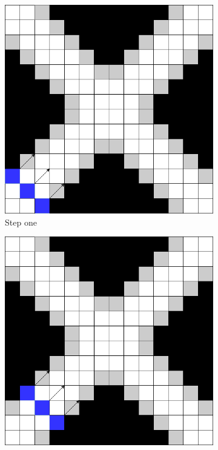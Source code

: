 \documentclass[../Head/Main.tex]{subfiles}
\begin{document}
\begin{figure}[H]
    \centering
    \begin{subfigure}{.22\textwidth}
        \centering
        \includegraphics[width=\textwidth]{../Figures/screening_algorithm/line_search_step1.png}
        \caption{Step one}
        \label{fig:line_search_step1}
    \end{subfigure}
    \hfill
    \begin{subfigure}{.22\textwidth}
        \centering
        \includegraphics[width=\textwidth]{../Figures/screening_algorithm/line_search_step2.png}

\end{subfigure}
\end{figure}
\end{document}
